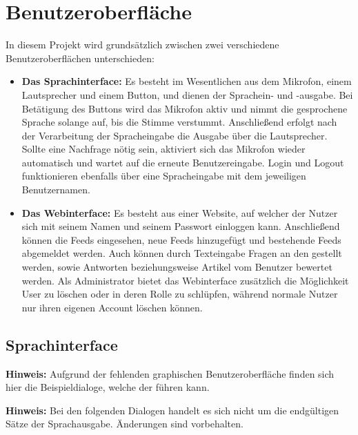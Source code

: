 
\chapter{Benutzeroberfläche}

In diesem Projekt wird grundsätzlich zwischen zwei verschiedene Benutzeroberflächen unterschieden:

\begin{itemize}
	\item \textbf{Das Sprachinterface:} Es besteht im Wesentlichen aus dem Mikrofon, einem Lautsprecher und einem Button, und dienen der Sprachein- und -ausgabe. Bei Betätigung des Buttons wird das Mikrofon aktiv und nimmt die gesprochene Sprache solange auf, bis die Stimme verstummt. Anschließend erfolgt nach der Verarbeitung der Spracheingabe die Ausgabe über die Lautsprecher. Sollte eine Nachfrage nötig sein, aktiviert sich das Mikrofon wieder automatisch und wartet auf die erneute Benutzereingabe. Login und Logout funktionieren ebenfalls über eine Spracheingabe mit dem jeweiligen Benutzernamen.
    \item \textbf{Das Webinterface:} Es besteht aus einer Website, auf welcher der Nutzer sich mit seinem Namen und seinem Passwort einloggen kann. Anschließend können die Feeds eingesehen, neue Feeds hinzugefügt und bestehende Feeds abgemeldet werden. Auch können durch Texteingabe Fragen an den \NewsGenie gestellt werden, sowie Antworten beziehungsweise Artikel vom Benutzer bewertet werden. Als Administrator bietet das Webinterface zusätzlich die Möglichkeit User zu löschen oder in deren Rolle zu schlüpfen, während normale Nutzer nur ihren eigenen Account löschen können.
\end{itemize}

\section{Sprachinterface}

\textbf{Hinweis:}
Aufgrund der fehlenden graphischen Benutzeroberfläche finden sich hier die Beispieldialoge, welche der \NewsGenie führen kann.

\textbf{Hinweis:}
Bei den folgenden Dialogen handelt es sich nicht um die endgültigen Sätze der Sprachausgabe. Änderungen sind vorbehalten.

\newpage

